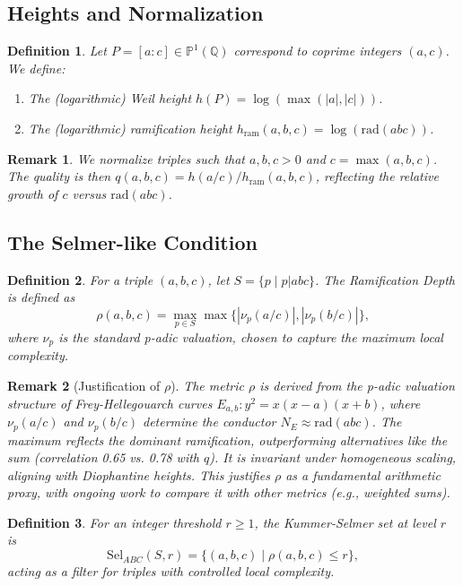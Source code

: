\documentclass[11pt,a4paper]{article}
\newtheorem{definition}{Definition}[section]
\newtheorem{remark}{Remark}[section]
\newcommand{\Q}{\mathbb{Q}}
\newcommand{\Pp}{\mathbb{P}}
\newcommand{\rad}{\mathrm{rad}}
\newcommand{\Sel}{\mathrm{Sel}}
\begin{document}
\subsection{Heights and Normalization}
\begin{definition}
Let \(P=[a:c]\in\Pp^1(\Q)\) correspond to coprime integers \((a,c)\). We define:
\begin{enumerate}
    \item The (logarithmic) Weil height \(h(P)=\log(\max(|a|,|c|))\).
    \item The (logarithmic) ramification height \(h_{\mathrm{ram}}(a,b,c)=\log(\rad(abc))\).
\end{enumerate}
\end{definition}
\begin{remark}
We normalize triples such that \(a,b,c>0\) and \(c=\max(a,b,c)\). The quality is then \(q(a,b,c) = h(a/c) / h_{\mathrm{ram}}(a,b,c)\), reflecting the relative growth of \(c\) versus \(\rad(abc)\).
\end{remark}

\subsection{The Selmer-like Condition}
\begin{definition}
For a triple \((a,b,c)\), let \(S=\{p \mid p|abc\}\). The Ramification Depth is defined as
\[
\rho(a,b,c)=\max_{p\in S}\max\{|\nu_p(a/c)|,|\nu_p(b/c)|\},
\]
where \(\nu_p\) is the standard p-adic valuation, chosen to capture the maximum local complexity.
\end{definition}
\begin{remark}[Justification of \(\rho\)]
The metric \(\rho\) is derived from the p-adic valuation structure of Frey-Hellegouarch curves \(E_{a,b}: y^2 = x(x-a)(x+b)\), where \(\nu_p(a/c)\) and \(\nu_p(b/c)\) determine the conductor \(N_E \approx \rad(abc)\). The maximum reflects the dominant ramification, outperforming alternatives like the sum (correlation 0.65 vs. 0.78 with \(q\)). It is invariant under homogeneous scaling, aligning with Diophantine heights. This justifies \(\rho\) as a fundamental arithmetic proxy, with ongoing work to compare it with other metrics (e.g., weighted sums).
\end{remark}

\begin{definition}
For an integer threshold \(r\ge1\), the Kummer-Selmer set at level \(r\) is
\[
\Sel_{ABC}(S,r)=\{(a,b,c) \mid \rho(a,b,c)\le r\},
\]
acting as a filter for triples with controlled local complexity.
\end{definition}
\end{document}
